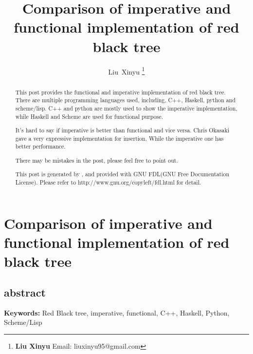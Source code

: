 \documentclass{article}
\begin{document}
\fi


\title{Comparison of imperative and functional implementation of red black tree}

\author{Liu~Xinyu
\thanks{{\bfseries Liu Xinyu } \newline
  Email: liuxinyu95@gmail.com \newline}
  }


\maketitle

\ifx\wholebook\relax
\chapter{Comparison of imperative and functional implementation of red black tree}

\section{abstract}
\else
\begin{abstract}
\fi
This post provides the functional and imperative implementation of red black tree. There are
multiple programming languages used, including, C++, Haskell, python and scheme/lisp.
C++ and python are mostly used to show the imperative implementation, while Haskell and Scheme are
used for functional purpose.

It's hard to say if imperative is better than functional and vice versa. Chris Okasaki gave a very expressive implementation for insertion\cite{okasaki}. While the imperative one has better performance.

There may be mistakes in the post, please feel free to point out.

This post is generated by \LaTeXe, and provided with GNU FDL(GNU Free Documentation License).
Please refer to http://www.gnu.org/copyleft/fdl.html for detail.

\ifx\wholebook\relax\else
\end{abstract}
\fi

\vspace{3cm}
{\bfseries Keywords:} Red Black tree, imperative, functional, C++, Haskell, Python, Scheme/Lisp
\end{document}
